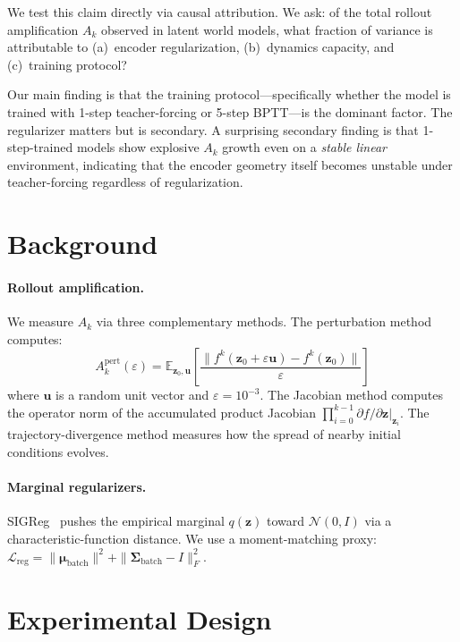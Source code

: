 \documentclass{article}
\begin{document}
We test this claim directly via causal attribution.
We ask: of the total rollout amplification $A_k$ observed in latent world models, what fraction
of variance is attributable to (a)~encoder regularization, (b)~dynamics capacity, and (c)~training protocol?

Our main finding is that the training protocol---specifically whether the model is trained with
1-step teacher-forcing or 5-step BPTT---is the dominant factor.
The regularizer matters but is secondary.
A surprising secondary finding is that 1-step-trained models show explosive $A_k$ growth even
on a \emph{stable linear} environment, indicating that the encoder geometry itself becomes
unstable under teacher-forcing regardless of regularization.

\section{Background}

\paragraph{Rollout amplification.}
We measure $A_k$ via three complementary methods.
The perturbation method computes:
\begin{equation}
A_k^{\text{pert}}(\varepsilon) = \mathbb{E}_{\mathbf{z}_0, \mathbf{u}} \left[
  \frac{\|f^k(\mathbf{z}_0 + \varepsilon \mathbf{u}) - f^k(\mathbf{z}_0)\|}{\varepsilon}
\right]
\end{equation}
where $\mathbf{u}$ is a random unit vector and $\varepsilon = 10^{-3}$.
The Jacobian method computes the operator norm of the accumulated product Jacobian
$\prod_{i=0}^{k-1} \partial f / \partial \mathbf{z}|_{\mathbf{z}_i}$.
The trajectory-divergence method measures how the spread of nearby initial conditions evolves.

\paragraph{Marginal regularizers.}
SIGReg~\citep{jepa2025lewm} pushes the empirical marginal $q(\mathbf{z})$ toward $\mathcal{N}(0, I)$
via a characteristic-function distance.
We use a moment-matching proxy:
$\mathcal{L}_{\text{reg}} = \|\boldsymbol{\mu}_{\text{batch}}\|^2 + \|\boldsymbol{\Sigma}_{\text{batch}} - I\|_F^2$.

\section{Experimental Design}
\end{document}
